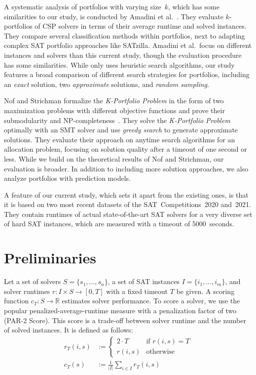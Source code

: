 \documentclass[conference]{IEEEtran}
\begin{document}
A systematic analysis of portfolios with varying size~$k$, which has some similarities to our study, is conducted by Amadini et al.~\cite{amadini2014empirical, amadini2016extensive}.
They evaluate $k$-portfolios of CSP solvers in terms of their average runtime and solved instances. 
They compare several classification methods within portfolios, next to adapting complex SAT portfolio approaches like SATzilla. 
Amadini et al.\ focus on different instances and solvers than this current study, though the evaluation procedure has some similarities.
While \cite{amadini2014empirical} only uses heuristic search algorithms, our study features a broad comparison of different search strategies for portfolios, including an \emph{exact} solution, two \emph{approximate} solutions, and \emph{random sampling}. 

Nof and Strichman formalize the \emph{K-Portfolio Problem} in the form of two maximization problems with different objective functions and prove their submodularity and NP-completeness~\cite{nof2020real}. 
They solve the \emph{K-Portfolio Problem} optimally with an SMT solver and use \emph{greedy search} to generate approximate solutions.
They evaluate their approach on anytime search algorithms for an allocation problem, focusing on solution quality after a timeout of one second or less. 
While we build on the theoretical results of Nof and Strichman, our evaluation is broader. 
In addition to including more solution approaches, we also analyze portfolios with prediction models.

A feature of our current study, which sets it apart from the existing ones, is that it is based on two most recent datasets of the SAT~Competitions~2020 and~2021. 
They contain runtimes of actual state-of-the-art SAT solvers for a very diverse set of hard SAT instances, which are measured with a timeout of 5000~seconds.

\section{Preliminaries}
\label{sec:preliminaries}

Let a set of solvers $S = \{s_1, \dots, s_n\}$, a set of SAT instances $I = \{i_1, \dots, i_m\}$, and solver runtimes $r: I \times S \rightarrow [0, T]$ with a fixed timeout $T$ be given.
A scoring function $c_T: S \rightarrow \mathbb{R}$ estimates solver performance. 
To score a solver, we use the popular penalized-average-runtime measure with a penalization factor of two (PAR-2 Score). 
This score is a trade-off between solver runtime and the number of solved instances.
It is defined as follows:%
\begin{align}
r_T(i,s) &:= \begin{cases}
	2 \cdot T & \text{if }r(i,s) = T\\
	r(i,s) & \text{otherwise}
\end{cases} \tag*{Penalized Runtimes}\\[.5em]
c_T(s) &:= \frac{1}{|I|} \sum_{i \in I}{r_T(i,s)} \tag*{PAR-2 Score}
\end{align}
\end{document}
